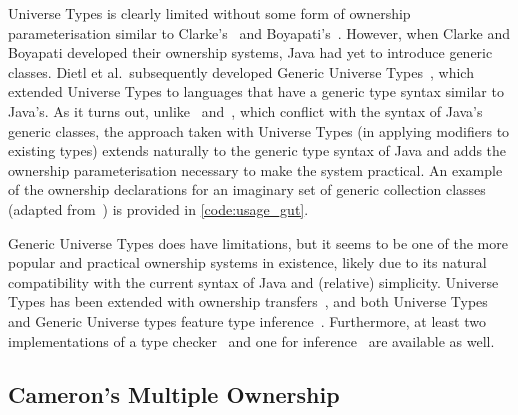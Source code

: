 \documentclass{acm_proc_article-sp}
\begin{document}


Universe Types is clearly limited without some form of ownership
parameterisation similar to Clarke's~\cite{clarke03ownership} and
Boyapati's~\cite{boyapati04safejava}. However, when Clarke and Boyapati
developed their ownership systems, Java had yet to introduce generic classes.
Dietl et al.\ subsequently developed Generic Universe
Types~\cite{dietl07gut,dietl09gut,dietl11gut}, which extended Universe Types to
languages that have a generic type syntax similar to Java's. As it turns out,
unlike~\cite{clarke03ownership} and~\cite{boyapati04safejava}, which conflict
with the syntax of Java's generic classes, the approach taken with Universe
Types (in applying modifiers to existing types) extends naturally to the
generic type syntax of Java and adds the ownership parameterisation necessary
to make the system practical. An example of the ownership declarations for an
imaginary set of generic collection classes (adapted from~\cite{dietl07gut}) is
provided in \cref{code:usage_gut}.

Generic Universe Types does have limitations, but it seems to be one of the more
popular and practical ownership systems in existence, likely due to its natural
compatibility with the current syntax of Java and (relative) simplicity.
Universe Types has been extended with ownership
transfers~\cite{muller07transfer}, and both Universe Types and Generic Universe
types feature type inference~\cite{dietl11inference}. Furthermore, at least two
implementations of a type checker~\cite{cameron10gut,dietl14checker} and one for
inference~\cite{dietl14checker} are available as well.

%
%


\subsection{Cameron's Multiple Ownership}
\label{subsec:cameron}
\end{document}
